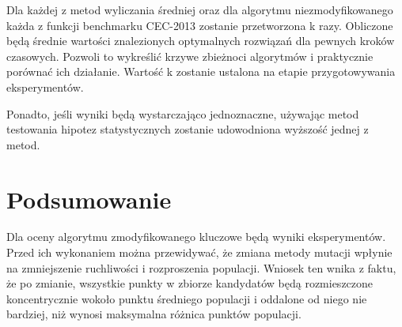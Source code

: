 \documentclass{scrartcl}
\begin{document}
Dla każdej z metod wyliczania średniej oraz dla algorytmu niezmodyfikowanego każda z funkcji benchmarku CEC-2013 zostanie przetworzona k razy. Obliczone będą średnie wartości znalezionych optymalnych rozwiązań dla pewnych kroków czasowych. Pozwoli to wykreślić krzywe zbieżnoci algorytmów i praktycznie porównać ich działanie. Wartość k zostanie ustalona na etapie przygotowywania eksperymentów.

Ponadto, jeśli wyniki będą wystarczająco jednoznaczne, używając metod testowania hipotez statystycznych zostanie udowodniona wyższość jednej z metod.

\section{Podsumowanie}

Dla oceny algorytmu zmodyfikowanego kluczowe będą wyniki eksperymentów. Przed ich wykonaniem można przewidywać, że zmiana metody mutacji wpłynie na zmniejszenie ruchliwości i rozproszenia populacji. Wniosek ten wnika z faktu, że po zmianie, wszystkie punkty w zbiorze kandydatów będą rozmieszczone koncentrycznie wokoło punktu średniego populacji i oddalone od niego nie bardziej, niż wynosi maksymalna różnica punktów populacji.
\end{document}
